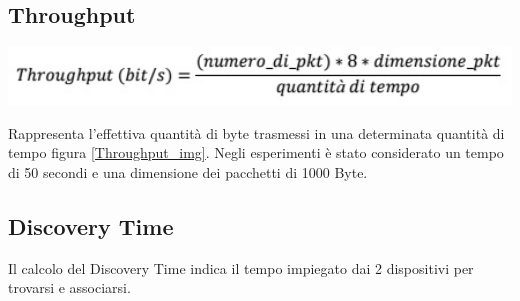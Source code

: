 \subsection{Throughput}
\begin{center}
\includegraphics[width=1\textwidth]{imgs/Throughput.jpg}
\label{Throughput_img}%
\end{center}

Rappresenta l’effettiva quantità di byte trasmessi in una determinata quantità di tempo figura \ref{Throughput_img}.
Negli esperimenti è stato considerato un tempo di 50 secondi e una dimensione dei pacchetti di 1000 Byte.

\subsection{Discovery Time}

Il calcolo del Discovery Time indica il tempo impiegato dai 2 dispositivi per trovarsi e associarsi.





\clearpage{\pagestyle{empty}\cleardoublepage}